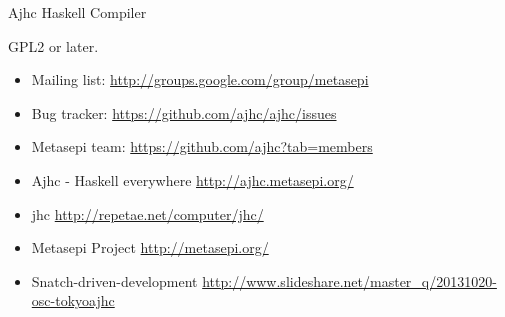 \documentclass[DIV16,twocolumn,10pt]{scrreprt}
\begin{document}
\begin{hcarentry}{Ajhc Haskell Compiler}
\License

GPL2 or later.

\Contact
  \begin{itemize}
    \item Mailing list: \url{http://groups.google.com/group/metasepi}
    \item Bug tracker: \url{https://github.com/ajhc/ajhc/issues}
    \item Metasepi team: \url{https://github.com/ajhc?tab=members}
  \end{itemize}

\FurtherReading
  \begin{itemize}
    \item Ajhc - Haskell everywhere \url{http://ajhc.metasepi.org/}
    \item jhc \url{http://repetae.net/computer/jhc/}
    \item Metasepi Project \url{http://metasepi.org/}
    \item Snatch-driven-development \url{http://www.slideshare.net/master\_q/20131020-osc-tokyoajhc}
  \end{itemize}
\end{hcarentry}
\end{document}
